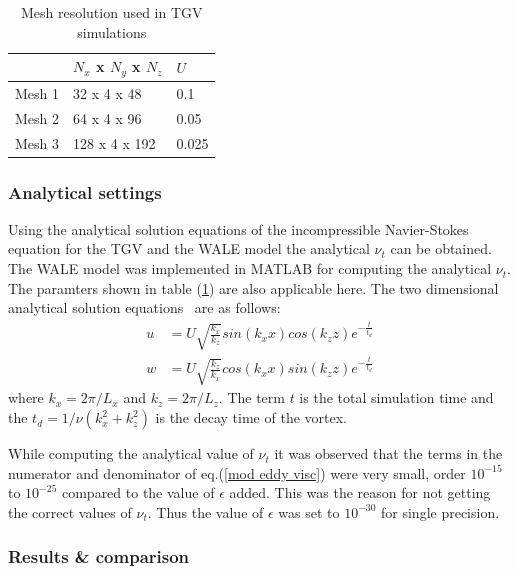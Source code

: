 %
\begin{table}[h!]
\begin{center}
\begin{tabular}{ p{1.5cm}|p{2.5cm}|p{1cm}} 

 & $N_x$ x $N_y$ x $N_z$ & $U$\\
  \hline
   Mesh 1& 32 x 4 x 48 & 0.1\\
  \hline
  Mesh 2& 64 x 4 x 96 & 0.05\\
  \hline
  Mesh 3 & 128 x 4 x 192 & 0.025\\
  \hline
\end{tabular}
\end{center}
\caption{Mesh resolution used in TGV simulations}
\label{resolution TGV}
\end{table}
%
\subsubsection{Analytical settings}
Using the analytical solution equations of the incompressible Navier-Stokes equation for the TGV and the WALE model the analytical $\nu_t$ can be obtained. The WALE model was implemented in MATLAB for computing the analytical $\nu_t$. The paramters shown in table (\ref{resolution TGV}) are also applicable here. The two dimensional analytical solution equations~\cite{krueger:book} are as follows:
%
\begin{equation}
\label{analytical sol}
\begin{split}
u &= U \sqrt{\frac{k_x}{k_z}}sin\left(k_xx\right)cos\left(k_zz\right)e^{-\frac{t}{t_d}}\\
w &= U \sqrt{\frac{k_z}{k_x}}cos\left(k_xx\right)sin\left(k_zz\right)e^{-\frac{t}{t_d}}\end{split}
\end{equation}
%
where $k_x = 2\pi/L_x$ and $k_z = 2\pi/L_z$. The term $t$ is the total simulation time and the $t_d = 1/\nu\left(k_x^2 + k_z^2\right)$ is the decay time of the vortex.

While computing the analytical value of $\nu_t$ it was observed that the terms in the numerator and denominator of eq.(\ref{mod eddy visc}) were very small, order $10^{-15}$ to $10^{-25}$ compared to the value of $\epsilon$ added. This was the reason for not getting the correct values of $\nu_t$. Thus the value of $\epsilon$ was set to $10^{-30}$ for single precision.

\subsubsection{Results \& comparison}

